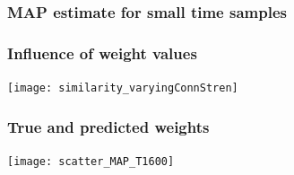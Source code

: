 \documentclass[final]{beamer}
\begin{document}
\begin{frame}
\frametitle{MAP estimate for small time samples}
\begin{center}
\end{center}
\end{frame}

\begin{frame}
\frametitle{Influence of weight values}
\begin{center}
\texttt{[image: similarity\_varyingConnStren]}
\end{center}
\end{frame}

\begin{frame}
\frametitle{True and predicted weights}
\begin{center}
	\texttt{[image: scatter\_MAP\_T1600]}
\end{center}
\end{frame}
\end{document}
